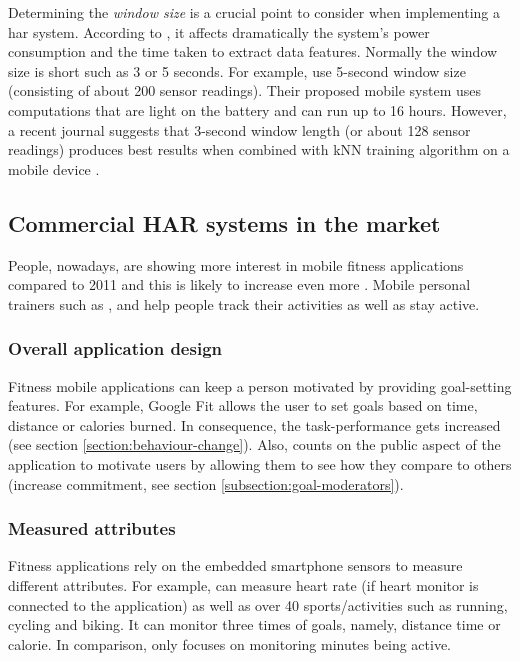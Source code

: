         Determining the \textit{window size} is a crucial point to consider when implementing a \gls{har} system. According to \citet[2]{torreshuitzil2015}, it affects dramatically the system’s power consumption and the time taken to extract data features. Normally the window size is short such as 3 or 5 seconds. For example, \citet[3]{torreshuitzil2015} use 5-second window size (consisting of about 200 sensor readings). Their proposed mobile system uses computations that are light on the battery and can run up to 16 hours. However, a recent journal suggests that 3-second window length (or about 128 sensor readings) produces best results when combined with kNN training algorithm on a mobile device \citep[126-136]{bashir2016}. 
        
    \subsection{Commercial HAR systems in the market}
    \label{section:commercial-har-systems}
    People, nowadays, are showing more interest in mobile fitness applications compared to 2011 and this is likely to increase even more \citep{googletrends}. Mobile personal trainers such as \citet[]{endomondo2017}, \citet[]{fitnesskeeper2017} and \citet[]{human2017}  help people track their activities as well as stay active.
    
        \subsubsection{Overall application design}
        Fitness mobile applications can keep a person motivated by providing goal-setting features. For example, Google Fit \citep{googleinc2017} allows the user to set goals based on time, distance or calories burned. In consequence, the task-performance gets increased (see section \ref{section:behaviour-change}). Also, \citet[]{human2017} counts on the public aspect of the application to motivate users by allowing them to see how they compare to others (increase commitment, see section \ref{subsection:goal-moderators}).
        
        \subsubsection{Measured attributes}
        Fitness applications rely on the embedded smartphone sensors to measure different attributes. For example, \citet[]{endomondo2017} can measure heart rate (if heart monitor is connected to the application) as well as over 40 sports/activities such as running, cycling and biking. It can monitor three times of goals, namely, distance time or calorie. In comparison, \citet[]{human2017} only focuses on monitoring minutes being active.
        
